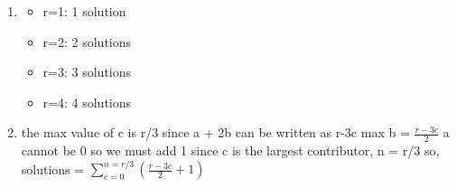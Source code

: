 \documentclass{homework}
\begin{document}
\begin{sol}
  \begin{enumerate}[label=(\alph*)]
    \item \begin{itemize}
        \item r=1: 1 solution
        \item r=2: 2 solutions
        \item r=3: 3 solutions
        \item r=4: 4 solutions
      \end{itemize}
    \item the max value of c is r/3 since a + 2b can be written as r-3c \newline 
      max b = $\frac{r-3c}{2}$\newline 
      a cannot be 0 so we must add 1 \newline 
      since c is the largest contributor, n = r/3 \newline 
    so, solutions = $\sum_{c=0}^{n=r/3}(\frac{r-3c}{2}+1)$
  \end{enumerate}
\end{sol}
\end{document}
